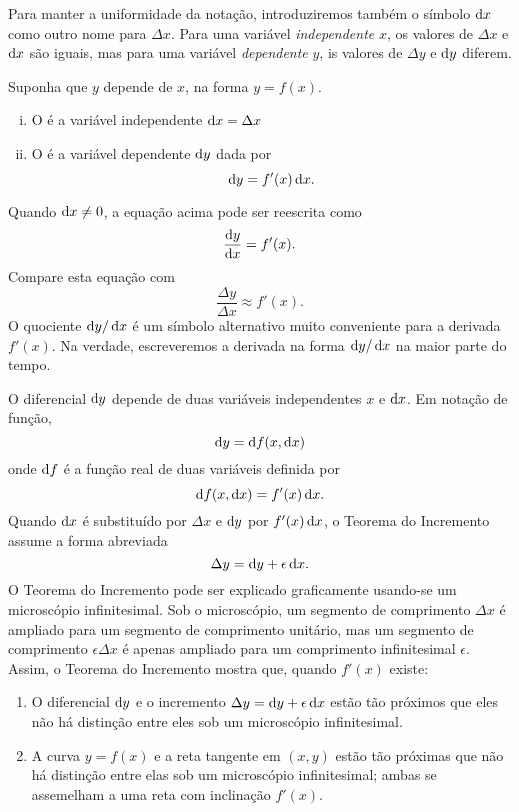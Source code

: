 
Para manter a uniformidade da notação, introduziremos também o símbolo
$\dif x$ como outro nome para $\Delta x$. Para uma variável \emph{independente}
$x$, os valores de $\Delta x$ e $\dif x$ são iguais, mas para uma variável
\emph{dependente} $y$, is valores de $\Delta y$ e $\dif y$ diferem.

\begin{defin}
Suponha que $y$ depende de $x$, na forma $y = f(x)$.
\begin{enumerate}[(i)]
\item O  é a variável independente $\dif x = \Delta x$
\item O  é a variável dependente $\dif y$ dada
      por
      $$
        \dif y = f'(x) \dif x.
      $$
\end{enumerate}
\end{defin}

Quando $\dif x \ne 0$, a equação acima pode ser reescrita como
$$
  \frac{\dif y}{\dif x} = f'(x).
$$
Compare esta equação com
$$
  \frac{\Delta y}{\Delta x} \approx f'(x).
$$
O quociente $\dif y/\dif x$ é um símbolo alternativo muito conveniente para
a derivada $f'(x)$. Na verdade, escreveremos a derivada na forma
$\dif y/\dif x$ na maior parte do tempo.

O diferencial $\dif y$ depende de duas variáveis independentes $x$ e $\dif x$.
Em notação de função,
$$
  \dif y = \dif f(x, \dif x)
$$
onde $\dif f$ é a função real de duas variáveis definida por
$$
  \dif f(x, \dif x) = f'(x) \dif x.
$$
Quando $\dif x$ é substituído por $\Delta x$ e $\dif y$ por $f'(x) \dif x$,
o Teorema do Incremento assume a forma abreviada 
$$
  \Delta y = \dif y + \epsilon \dif x.
$$
O Teorema do Incremento pode ser explicado graficamente usando-se um
microscópio infinitesimal. Sob o microscópio, um segmento de comprimento
$\Delta x$ é ampliado para um segmento de comprimento unitário, mas um
segmento de comprimento $\epsilon \Delta x$ é apenas ampliado para um
comprimento infinitesimal $\epsilon$. Assim, o Teorema do Incremento mostra
que, quando $f'(x)$ existe:
\begin{enumerate}[(1)]
\item O diferencial $\dif y$ e o incremento
      $\Delta y = \dif y + \epsilon \dif x$ estão tão próximos que eles
      não há distinção entre eles sob um microscópio infinitesimal.
\item A curva $y = f(x)$ e a reta tangente em $(x, y)$ estão tão próximas
      que não há distinção entre elas sob um microscópio infinitesimal;
      ambas se assemelham a uma reta com inclinação $f'(x)$.
\end{enumerate}

